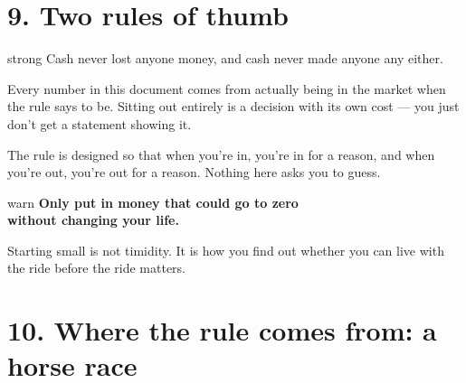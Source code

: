 \documentclass[12pt,a4paper]{article}
\begin{document}
\section{9. Two rules of thumb}

\begin{kbox}{strong}
Cash never lost anyone money, and cash never made anyone any either.

Every number in this document comes from actually being in the market
when the rule says to be. Sitting out entirely is a decision with its
own cost --- you just don't get a statement showing it.

\vspace{0.4em}
The rule is designed so that when you're in, you're in for a reason,
and when you're out, you're out for a reason. Nothing here asks you to
guess.
\end{kbox}

\vspace{0.3em}

\begin{kbox}{warn}
\centering
\Large\bfseries
Only put in money that could go to zero\\
without changing your life.

\vspace{0.6em}
\raggedright\normalsize\normalfont
Starting small is not timidity. It is how you find out whether you can
live with the ride before the ride matters.
\end{kbox}

\vspace{1em}

\newpage
\section{10. Where the rule comes from: a horse race}
\end{document}
